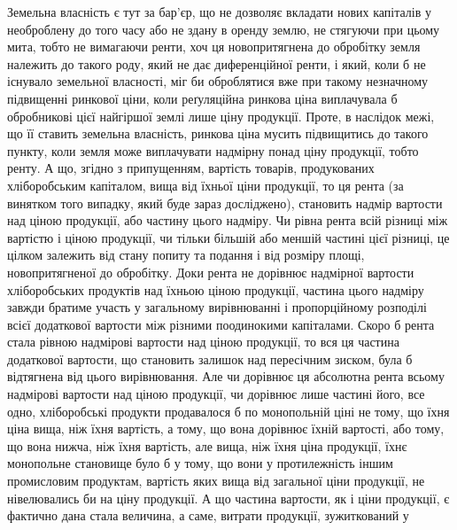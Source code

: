 Земельна власність є тут за бар’єр, що не дозволяє вкладати нових капіталів
у необроблену до того часу або не здану в оренду землю, не стягуючи
при цьому мита, тобто не вимагаючи ренти, хоч ця новопритягнена до обробітку
земля належить до такого роду, який не дає диференційної ренти, і який, коли б не існувало земельної
власності, міг би оброблятися вже при такому незначному підвищенні ринкової ціни, коли реґуляційна
ринкова ціна виплачувала б обробникові цієї найгіршої землі лише ціну продукції. Проте, в наслідок
межі, що її ставить земельна власність, ринкова ціна мусить підвищитись до такого пункту, коли земля
може виплачувати надмірну понад ціну продукції, тобто ренту. А що, згідно з припущенням, вартість
товарів, продукованих хліборобським капіталом, вища від їхньої ціни продукції, то ця рента (за
винятком того випадку, який буде зараз досліджено), становить надмір вартости над ціною продукції,
або частину цього надміру. Чи рівна рента всій різниці між вартістю і ціною продукції, чи тільки
більшій або меншій частині цієї різниці, це цілком залежить від стану попиту та подання і від
розміру площі, новопритягненої до обробітку. Доки рента не дорівнює надмірної вартости хліборобських
продуктів над їхньою ціною продукції, частина цього надміру завжди братиме участь у загальному
вирівнюванні і пропорційному розподілі всієї додаткової вартости між різними поодинокими капіталами.
Скоро б рента стала рівною надмірові вартости над ціною продукції, то вся ця частина додаткової
вартости, що становить залишок над пересічним зиском, була б відтягнена від цього вирівнювання. Але
чи дорівнює ця абсолютна рента всьому надмірові вартости над ціною продукції, чи дорівнює лише
частині його, все
одно, хліборобські продукти продавалося б по монопольній ціні не тому, що
їхня ціна вища, ніж їхня вартість, а тому, що вона дорівнює їхній вартості,
або тому, що вона нижча, ніж їхня вартість, але вища, ніж їхня ціна продукції, їхнє монопольне
становище було б у тому, що вони у
протилежність іншим промисловим продуктам, вартість яких вища від загальної ціни продукції, не
нівелювались би на ціну продукції. А що частина вартости, як і ціни продукції, є фактично дана стала
величина, а саме, витрати продукції, зужиткований у
\parbreak{}  %
